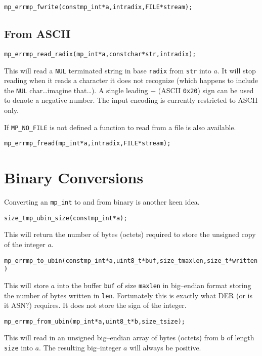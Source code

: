 \documentclass[synpaper]{book}
\begin{document}
\begin{alltt}
mp_err mp_fwrite(const mp_int *a, int radix, FILE *stream);
\end{alltt}

\subsection{From ASCII}
\begin{alltt}
mp_err mp_read_radix (mp_int *a, const char *str, int radix);
\end{alltt}
This will read a \texttt{NUL} terminated string in base \texttt{radix} from \texttt{str} into $a$.
It will stop reading when it reads a character it does not recognize (which happens to include the
\texttt{NUL} char\dots imagine that\dots).  A single leading $-$ (ASCII \texttt{0x20}) sign can be
used to denote a negative number. The input encoding is currently restricted to ASCII only.

If \texttt{MP\_NO\_FILE} is not defined a function to read from a file is also available.
\begin{alltt}
mp_err mp_fread(mp_int *a, int radix, FILE *stream);
\end{alltt}

\section{Binary Conversions}

Converting an \texttt{mp\_int} to and from binary is another keen idea.

\begin{alltt}
size_t mp_ubin_size(const mp_int *a);
\end{alltt}

This will return the number of bytes (octets) required to store the unsigned copy of the integer
$a$.

\begin{alltt}
mp_err mp_to_ubin(const mp_int *a, uint8_t *buf, size_t maxlen, size_t *written)
\end{alltt}
This will store $a$ into the buffer \texttt{buf} of size \texttt{maxlen} in big--endian format
storing the number of bytes written in \texttt{len}.  Fortunately this is exactly what DER (or is
it ASN?) requires.  It does not store the sign of the integer.

\begin{alltt}
mp_err mp_from_ubin(mp_int *a, uint8_t *b, size_t size);
\end{alltt}
This will read in an unsigned big--endian array of bytes (octets) from \texttt{b} of length
\texttt{size} into $a$.  The resulting big--integer $a$ will always be positive.
\end{document}

